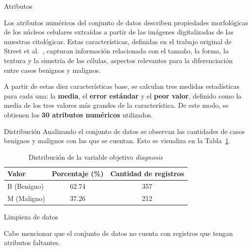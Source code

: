 \documentclass{beamer}
\begin{document}
\begin{frame}{Atributos}
	\small
	\justifying
	
	\begin{block}{}
		Los atributos numéricos del conjunto de datos describen propiedades morfológicas de los núcleos celulares extraídas a partir de las imágenes digitalizadas de las muestras citológicas. Estas características, definidas en el trabajo original de Street et al.~\cite{Street1993NuclearFE}, capturan información relacionada con el tamaño, la forma, la textura y la simetría de las células, aspectos relevantes para la diferenciación entre casos benignos y malignos.
	\end{block}
		\vspace{0.2cm}
		
	\begin{block}{}
		A partir de estas diez características base, se calculan tres medidas estadísticas para cada una: la \textbf{media}, el \textbf{error estándar} y el \textbf{peor valor}, definido como la media de los tres valores más grandes de la característica. De este modo, se obtienen los \textbf{30 atributos numéricos} utilizados.
	\end{block}
	
\end{frame}


\begin{frame}{Distribución}
	\small
	\justifying
	Analizando el conjunto de datos se observan las cantidades de casos benignos y malignos con las que se cuentan. Esto se visualiza en la Tabla~\ref{tab:diagnosis}.
	\begin{table}[H]
		\centering
		\caption{Distribución de la variable objetivo \emph{diagnosis}}
		\begin{tabular}{lcc}
			\toprule
			\textbf{Valor} & \textbf{Porcentaje (\%)} & \textbf{Cantidad de registros} \\
			\midrule
			B (Benigno) & 62.74 & 357 \\
			M (Maligno) & 37.26 & 212 \\
			\bottomrule
		\end{tabular}
		\label{tab:diagnosis}
	\end{table}
	
\end{frame}

\begin{frame}{Limpieza de datos}
	\small
	\justifying
	\begin{block}{}
		Cabe mencionar que el conjunto de datos no cuenta con registros que tengan atributos faltantes.
	\end{block}
\end{frame}
\end{document}
